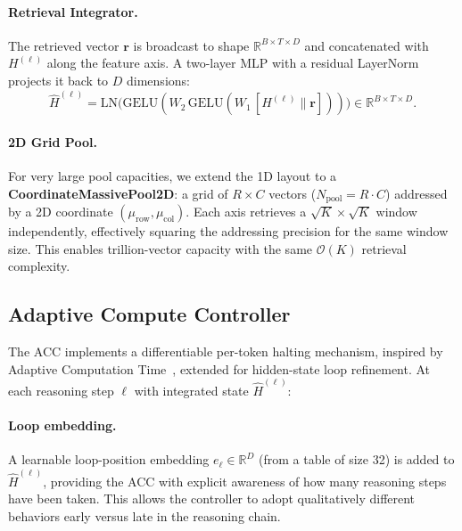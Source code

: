 \documentclass[11pt]{article}
\begin{document}
\paragraph{Retrieval Integrator.}
The retrieved vector $\mathbf{r}$ is broadcast to shape
$\mathbb{R}^{B \times T \times D}$ and concatenated with $H^{(\ell)}$ along
the feature axis.
A two-layer MLP with a residual LayerNorm projects it back to $D$ dimensions:
\begin{equation}
  \hat{H}^{(\ell)} = \mathrm{LN}\!\bigl(
    \mathrm{GELU}(W_2\,\mathrm{GELU}(W_1\,[H^{(\ell)} \| \mathbf{r}]))
  \bigr) \in \mathbb{R}^{B \times T \times D}.
\end{equation}

\paragraph{2D Grid Pool.}
For very large pool capacities, we extend the 1D layout to a
\textbf{CoordinateMassivePool2D}: a grid of $R \times C$ vectors
($N_{\text{pool}} = R \cdot C$) addressed by a 2D coordinate
$(\mu_{\text{row}}, \mu_{\text{col}})$.
Each axis retrieves a $\sqrt{K} \times \sqrt{K}$ window independently,
effectively squaring the addressing precision for the same window size.
This enables trillion-vector capacity with the same $\mathcal{O}(K)$ retrieval
complexity.

\subsection{Adaptive Compute Controller}
\label{sec:acc}

The ACC implements a differentiable per-token halting mechanism, inspired by
Adaptive Computation Time~\citep{graves2016act}, extended for hidden-state
loop refinement.
At each reasoning step $\ell$ with integrated state $\hat{H}^{(\ell)}$:

\paragraph{Loop embedding.}
A learnable loop-position embedding $e_\ell \in \mathbb{R}^D$ (from a table
of size 32) is added to $\hat{H}^{(\ell)}$, providing the ACC with explicit
awareness of how many reasoning steps have been taken.
This allows the controller to adopt qualitatively different behaviors early
versus late in the reasoning chain.
\end{document}
